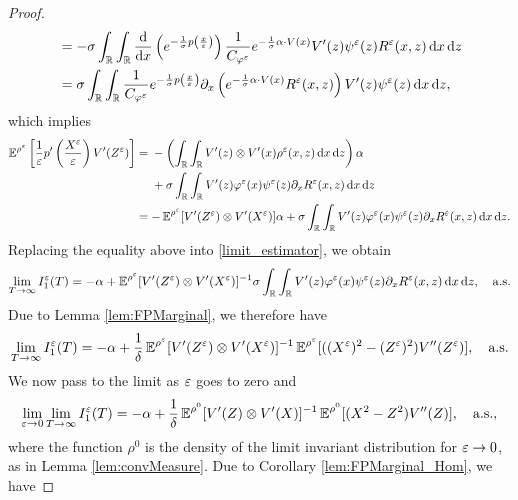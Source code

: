 \documentclass[10pt]{article}
\begin{document}
\begin{proof}
\begin{equation}
\begin{aligned}
	&= -\sigma \int_{\mathbb{R}} \int_{\mathbb{R}} \frac{\mathrm{d}}{\mathrm{d} x}\left( e^{ - \frac{1}{\sigma} p \left ( \frac{x}{\varepsilon} \right)} \right) \frac{1}{C_{\varphi^\varepsilon}} e^{- \frac{1}{\sigma} \alpha \cdot V(x)} V'(z) \psi^\varepsilon(z) R^\varepsilon(x,z) \,\mathrm{d} x \,\mathrm{d} z \\
	&= \sigma \int_{\mathbb{R}} \int_{\mathbb{R}} \frac{1}{C_{\varphi^\varepsilon}} e^{ - \frac{1}{\sigma} p \left ( \frac{x}{\varepsilon} \right)} \partial_x \left ( e^{- \frac{1}{\sigma} \alpha \cdot V(x)} R^\varepsilon(x,z) \right ) V'(z) \psi^\varepsilon(z) \,\mathrm{d} x \,\mathrm{d} z,
\end{aligned}
\end{equation}
which implies
\begin{align}
	\operatorname{\mathbb{E}}^{\rho^\varepsilon} \left [ \frac{1}{\varepsilon} p' \left ( \frac{X^\varepsilon}{\varepsilon} \right ) V'(Z^\varepsilon) \right ] &= 
	\begin{aligned}[t]
		&- \left(\int_{\mathbb{R}} \int_{\mathbb{R}} V'(z) \otimes V'(x) \rho^\varepsilon(x, z) \,\mathrm{d} x \,\mathrm{d} z\right) \alpha \\
		&+\sigma \int_{\mathbb{R}} \int_{\mathbb{R}} V'(z) \varphi^\varepsilon(x) \psi^\varepsilon(z) \partial_x R^\varepsilon(x,z) \,\mathrm{d} x \,\mathrm{d} z 
	\end{aligned}
	\\
	&= -  \operatorname{\mathbb{E}}^{\rho^\varepsilon} [ V'(Z^\varepsilon) \otimes V'(X^\varepsilon) ]\alpha + \sigma \int_{\mathbb{R}} \int_{\mathbb{R}} V'(z) \varphi^\varepsilon(x) \psi^\varepsilon(z) \partial_x R^\varepsilon(x,z) \,\mathrm{d} x \,\mathrm{d} z.
\end{align}
Replacing the equality above into \eqref{limit_estimator}, we obtain
\begin{equation}
\lim_{T \to \infty} I_1^\varepsilon(T) = -\alpha + \operatorname{\mathbb{E}}^{\rho^\varepsilon} [ V'(Z^\varepsilon) \otimes V'(X^\varepsilon) ]^{-1} \sigma \int_{\mathbb{R}} \int_{\mathbb{R}} V'(z) \varphi^\varepsilon(x) \psi^\varepsilon(z) \partial_x R^\varepsilon(x,z) \,\mathrm{d} x \,\mathrm{d} z, \quad \text{a.s.}
\end{equation}
Due to Lemma \ref{lem:FPMarginal}, we therefore have
\begin{equation}
	\lim_{T \to \infty} I_1^\varepsilon(T) = -\alpha + \frac1\delta \operatorname{\mathbb{E}}^{\rho^\varepsilon} [ V'(Z^\varepsilon) \otimes V'(X^\varepsilon) ]^{-1} \operatorname{\mathbb{E}}^{\rho^\varepsilon}[((X^\varepsilon)^2 - (Z^\varepsilon)^2)V''(Z^\varepsilon)], \quad \text{a.s.}	
\end{equation}
We now pass to the limit as $\varepsilon$ goes to zero and
\begin{equation} \label{limit_estimator_2}
	\lim_{\varepsilon \to 0} \lim_{T \to \infty} I_1^\varepsilon(T) = -\alpha + \frac1\delta \operatorname{\mathbb{E}}^{\rho^0} [ V'(Z) \otimes V'(X) ]^{-1} \operatorname{\mathbb{E}}^{\rho^0}[(X^2 - Z^2)V''(Z)], \quad \text{a.s.},
\end{equation}
where the function $\rho^0$ is the density of the limit invariant distribution for $\varepsilon \to 0$, as in Lemma \ref{lem:convMeasure}. Due to Corollary \ref{lem:FPMarginal_Hom}, we have

\end{proof}
\end{document}
